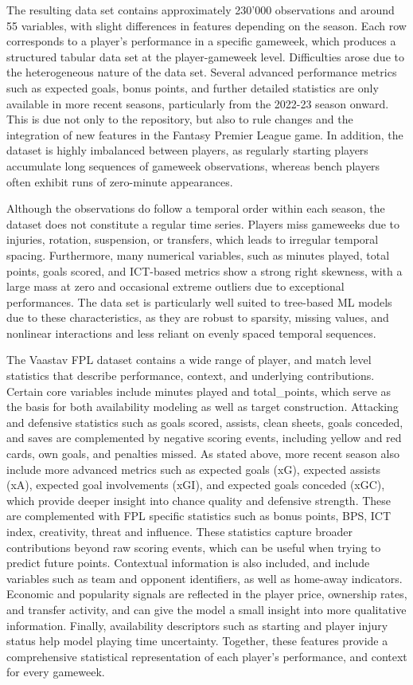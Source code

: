 \documentclass[11pt,a4paper]{article}
\begin{document}
The resulting data set contains approximately 230’000 observations and around 55 variables, with slight differences in features depending on the season. Each row corresponds to a player’s performance in a specific gameweek, which produces a structured tabular data set at the player-gameweek level. Difficulties arose due to the heterogeneous nature of the data set. Several advanced performance metrics such as expected goals, bonus points, and further detailed statistics are only available in more recent seasons, particularly from the 2022-23 season onward. This is due not only to the repository, but also to rule changes and the integration of new features in the Fantasy Premier League game. In addition, the dataset is highly imbalanced between players, as regularly starting players accumulate long sequences of gameweek observations, whereas bench players often exhibit runs of zero-minute appearances. 

Although the observations do follow a temporal order within each season, the dataset does not constitute a regular time series. Players miss gameweeks due to injuries, rotation, suspension, or transfers, which leads to irregular temporal spacing. Furthermore, many numerical variables, such as minutes played, total points, goals scored, and ICT-based metrics show a strong right skewness, with a large mass at zero and occasional extreme outliers due to exceptional performances. The data set is particularly well suited to tree-based ML models due to these characteristics, as they are robust to sparsity, missing values, and nonlinear interactions and less reliant on evenly spaced temporal sequences. 

The Vaastav FPL dataset contains a wide range of player, and match level statistics that describe performance, context, and underlying contributions. Certain core variables include minutes played and total\_points, which serve as the basis for both availability modeling as well as target construction. Attacking and defensive statistics such as goals scored, assists, clean sheets, goals conceded, and saves are complemented by negative scoring events, including yellow and red cards, own goals, and penalties missed. As stated above, more recent season also include more advanced metrics such as expected goals (xG), expected assists (xA), expected goal involvements (xGI), and expected goals conceded (xGC), which provide deeper insight into chance quality and defensive strength. These are complemented with FPL specific statistics such as bonus points, BPS, ICT index, creativity, threat and influence. These statistics capture broader contributions beyond raw scoring events, which can be useful when trying to predict future points. Contextual information is also included, and include variables such as team and opponent identifiers, as well as home-away indicators. Economic and popularity signals are reflected in the player price, ownership rates, and transfer activity, and can give the model a small insight into more qualitative information. Finally, availability descriptors such as starting and player injury status help model playing time uncertainty. Together, these features provide a comprehensive statistical representation of each player’s performance, and context for every gameweek. 
\end{document}
